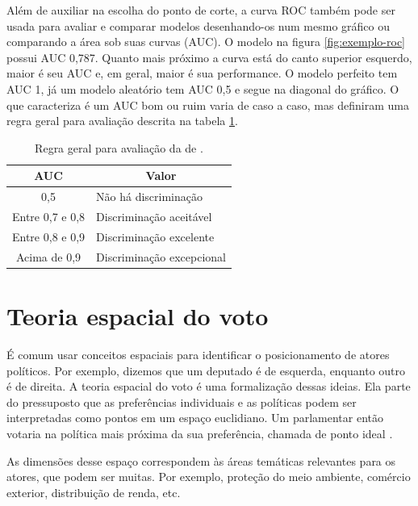 \documentclass[a4paper,titlepage]{ppgi}\usepackage[]{graphicx}\usepackage[]{color}
\begin{document}
Além de auxiliar na escolha do ponto de corte, a curva \gls{ROC} também pode
ser usada para avaliar e comparar modelos desenhando-os num mesmo gráfico ou
comparando a área sob suas curvas (\acrshort{AUC}). O modelo na figura
\ref{fig:exemplo-roc} possui \acrshort{AUC} 0,787. Quanto mais próximo a curva está
do canto superior esquerdo, maior é seu \acrshort{AUC} e, em geral, maior é sua
performance.  O modelo perfeito tem \acrshort{AUC} 1, já um modelo aleatório
tem \acrshort{AUC} 0,5 e segue na diagonal do gráfico. O que caracteriza é um
\acrshort{AUC} bom ou ruim varia de caso a caso, mas 
definiram uma regra geral para avaliação descrita na tabela
\ref{table:valores-auc}.

\begin{table}
\centering
\begin{tabular}{c l}
  \acrshort{AUC} & \multicolumn{1}{c}{Valor} \\
  \hline
  0,5 & Não há discriminação \\
  Entre 0,7 e 0,8 & Discriminação aceitável \\
  Entre 0,8 e 0,9 & Discriminação excelente \\
  Acima de 0,9 & Discriminação excepcional \\
\end{tabular}
\caption{Regra geral para avaliação da  de .}
\label{table:valores-auc}
\end{table}

\section{Teoria espacial do voto}
\label{cap:fundamentacao:teoria-espacial-do-voto}



É comum usar conceitos espaciais para identificar o posicionamento de
atores políticos. Por exemplo, dizemos que um deputado é de esquerda, enquanto
outro é de direita. A teoria espacial do voto é uma formalização dessas ideias.
Ela parte do pressuposto que as preferências individuais e as políticas podem
ser interpretadas como pontos em um espaço euclidiano. Um parlamentar então
votaria na política mais próxima da sua preferência, chamada de ponto ideal
\cite{Leoni2002}.

As dimensões desse espaço correspondem às áreas temáticas relevantes para os
atores, que podem ser muitas. Por exemplo, proteção do meio ambiente, comércio
exterior, distribuição de renda, etc.
\end{document}
